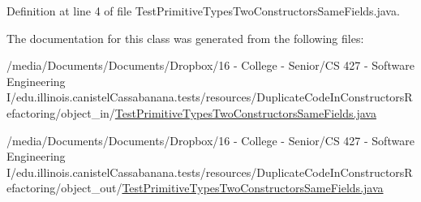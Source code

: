 Definition at line 4 of file TestPrimitiveTypesTwoConstructorsSameFields.java.



The documentation for this class was generated from the following files:\begin{DoxyCompactItemize}
\item 
/media/Documents/Documents/Dropbox/16 -\/ College -\/ Senior/CS 427 -\/ Software Engineering I/edu.illinois.canistelCassabanana.tests/resources/DuplicateCodeInConstructorsRefactoring/object\_\-in/\hyperlink{object__in_2TestPrimitiveTypesTwoConstructorsSameFields_8java}{TestPrimitiveTypesTwoConstructorsSameFields.java}\item 
/media/Documents/Documents/Dropbox/16 -\/ College -\/ Senior/CS 427 -\/ Software Engineering I/edu.illinois.canistelCassabanana.tests/resources/DuplicateCodeInConstructorsRefactoring/object\_\-out/\hyperlink{object__out_2TestPrimitiveTypesTwoConstructorsSameFields_8java}{TestPrimitiveTypesTwoConstructorsSameFields.java}\end{DoxyCompactItemize}
